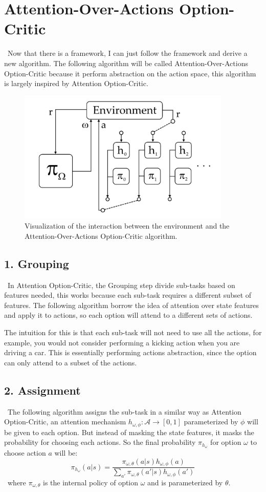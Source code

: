 \documentclass{article}
\begin{document}
	\section{Attention-Over-Actions Option-Critic}
	\qquad \ Now that there is a framework, I can just follow the framework and derive a new algorithm. The following algorithm will be called Attention-Over-Actions Option-Critic because it perform abstraction on the action space, this algorithm is largely inspired by Attention Option-Critic.
	\begin{figure}[h]
		\centering
		\includegraphics[width=4in]{aoaoc.png}
		\caption{Visualization of the interaction between the environment and the Attention-Over-Actions Option-Critic algorithm.}
	\end{figure}
	\subsection*{1. Grouping}
	\qquad \ In Attention Option-Critic, the Grouping step divide sub-tasks based on features needed, this works because each sub-task requires a different subset of features. The following algorithm borrow the idea of attention over state features and apply it to actions, so each option will attend to a different sets of actions. 
	
	\quad The intuition for this is that each sub-task will not need to use all the actions, for example, you would not consider performing a kicking action when you are driving a car. This is essentially performing actions abstraction, since the option can only attend to a subset of the actions.
	\subsection*{2. Assignment}
	\qquad \ The following algorithm assigns the sub-task in a similar way as Attention Option-Critic, an attention mechanism $h_{\omega,\phi}:\mathcal{A} \rightarrow [0,1]$ parameterized by $\phi$ will be given to each option. But instead of masking the state features, it masks the probability for choosing each actions. So the final probability $\pi_{h_\omega}$ for option $\omega$ to choose action $a$ will be: $$\pi_{h_\omega}(a|s) = \frac{\pi_{\omega,\theta}(a|s)h_{\omega, \phi}(a)}{\sum_{a'} \pi_{\omega,\theta}(a'|s)h_{\omega, \phi}(a')}$$ \qquad \ where $\pi_{\omega,\theta}$ is the internal policy of option $\omega$ and is parameterized by $\theta$.
\end{document}
